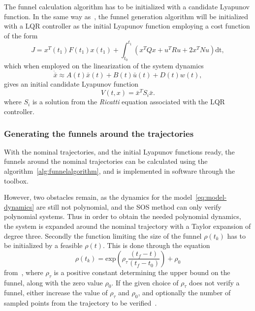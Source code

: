 The funnel calculation algorithm has to be initialized with a candidate Lyapunov
function. In the same way
as~\cite[Majumdar]{majumdarFunnelLibrariesRealtime2017}, the funnel generation
algorithm will be initialized with a \ac{LQR} controller as the initial Lyapunov
function employing a cost function of the form
\begin{equation}
  J = x^{T}(t_1)F(t_1)x(t_1) + \int_{t_{0}}^{t_{1}} \left( x^{T}Qx + u^{T}Ru + 2x^TNu \right) \mathrm{dt},
\end{equation}
which when employed on the linearization of the system dynamics
\begin{equation}
  \dot{\bar{x}} \approx A(t)\bar{x}(t) + B(t)\bar{u}(t) +D(t)w(t),
\end{equation}
gives an initial candidate Lyapunov function
\begin{equation}
  V(t,x) = {\bar{x}}^{T}S_{i}\bar{x}.
\end{equation}
where \(S_{i}\) is a solution from the \textit{Ricatti} equation associated with
the \ac{LQR} controller.

\subsubsection{Generating the funnels around the trajectories}
\label{subsec:generating-funnels}

With the nominal trajectories, and the initial Lyapunov functions ready, the
funnels around the nominal trajectories can be calculated using the
algorithm~\ref{alg:funnelalgorithm}, and is implemented in software through the
~\cite[sostools]{sostools} toolbox.

However, two obstacles remain, as the dynamics for the
model~\eqref{eq:model-dynamics} are still not polynomial, and the \ac{SOS}
method can only verify polynomial systems. Thus in order to obtain the needed
polynomial dynamics, the system is expanded around the nominal trajectory with a
Taylor expansion of degree three. Secondly the function limiting the size of the
funnel \(\rho(t_{k})\) has to be initialized by a feasible \(\rho(t)\). This is
done through the equation
\begin{equation}
  \rho(t_{k}) = \mathrm{exp}\left( \rho_{\tau}\frac{\left( t_{f} - t \right)}{\left( t_{f} - t_{0}  \right)}\right) + \rho_0
\end{equation}
from~\cite[eq.~6.sec~3]{tobenkinInvariantFunnelsTrajectories2010}, where
\(\rho_{\tau}\) is a positive constant determining the upper bound on the
funnel, along with the zero value \(\rho_0\). If the given choice of
\(\rho_{\tau}\) does not verify a funnel, either increase the value of
\(\rho_{\tau}\) and \(\rho_0\), and optionally the number of sampled points from
the trajectory to be verified~\cite{tobenkinInvariantFunnelsTrajectories2010}.

